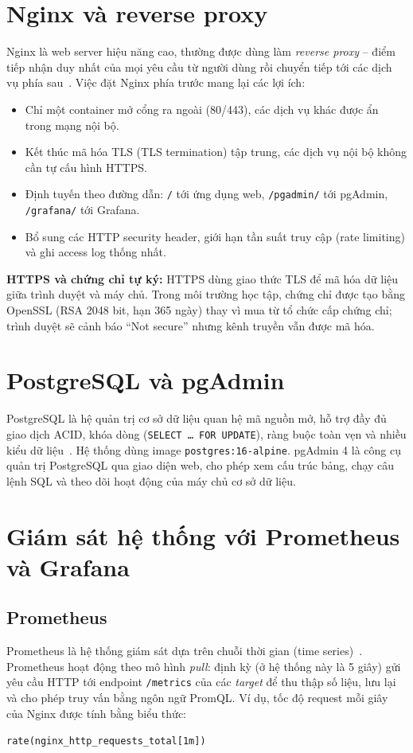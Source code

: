 \documentclass[../main.tex]{subfiles}
\begin{document}
\section{Nginx và reverse proxy}
Nginx là web server hiệu năng cao, thường được dùng làm \textit{reverse proxy} -- điểm tiếp nhận duy nhất của mọi yêu cầu từ người dùng rồi chuyển tiếp tới các dịch vụ phía sau~\cite{nginx-docs}. Việc đặt Nginx phía trước mang lại các lợi ích:
\begin{itemize}
    \item Chỉ một container mở cổng ra ngoài (80/443), các dịch vụ khác được ẩn trong mạng nội bộ.
    \item Kết thúc mã hóa TLS (TLS termination) tập trung, các dịch vụ nội bộ không cần tự cấu hình HTTPS.
    \item Định tuyến theo đường dẫn: \texttt{/} tới ứng dụng web, \texttt{/pgadmin/} tới pgAdmin, \texttt{/grafana/} tới Grafana.
    \item Bổ sung các HTTP security header, giới hạn tần suất truy cập (rate limiting) và ghi access log thống nhất.
\end{itemize}

\textbf{HTTPS và chứng chỉ tự ký:} HTTPS dùng giao thức TLS để mã hóa dữ liệu giữa trình duyệt và máy chủ. Trong môi trường học tập, chứng chỉ được tạo bằng OpenSSL (RSA 2048 bit, hạn 365 ngày) thay vì mua từ tổ chức cấp chứng chỉ; trình duyệt sẽ cảnh báo ``Not secure'' nhưng kênh truyền vẫn được mã hóa.

\section{PostgreSQL và pgAdmin}
PostgreSQL là hệ quản trị cơ sở dữ liệu quan hệ mã nguồn mở, hỗ trợ đầy đủ giao dịch ACID, khóa dòng (\texttt{SELECT \ldots{} FOR UPDATE}), ràng buộc toàn vẹn và nhiều kiểu dữ liệu~\cite{postgres-docs}. Hệ thống dùng image \texttt{postgres:16-alpine}. pgAdmin 4 là công cụ quản trị PostgreSQL qua giao diện web, cho phép xem cấu trúc bảng, chạy câu lệnh SQL và theo dõi hoạt động của máy chủ cơ sở dữ liệu.

\section{Giám sát hệ thống với Prometheus và Grafana}
\subsection{Prometheus}
Prometheus là hệ thống giám sát dựa trên chuỗi thời gian (time series)~\cite{prometheus-docs}. Prometheus hoạt động theo mô hình \textit{pull}: định kỳ (ở hệ thống này là 5 giây) gửi yêu cầu HTTP tới endpoint \texttt{/metrics} của các \textit{target} để thu thập số liệu, lưu lại và cho phép truy vấn bằng ngôn ngữ PromQL. Ví dụ, tốc độ request mỗi giây của Nginx được tính bằng biểu thức:
\begin{center}\texttt{rate(nginx\_http\_requests\_total[1m])}\end{center}
\end{document}

